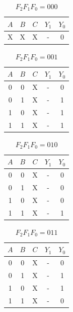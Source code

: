 \documentclass[11pt, a4paper]{article}
\begin{document}
\begin{minipage}[t]{0.48\textwidth}
\begin{table}[H]
    \centering
    \caption{$F_2 F_1 F_0 = 000$}
    \begin{tabular}{|ccc|cc|}
        \hline
        $A$ & $B$ & $C$ & $Y_1$ & $Y_0$ \\
        \hline
        X & X & X & - & 0 \\
        \hline
    \end{tabular}
\end{table}
\end{minipage}
\hfill
\begin{minipage}[t]{0.48\textwidth}
\begin{table}[H]
    \centering
    \caption{$F_2 F_1 F_0 = 001$}
    \begin{tabular}{|ccc|cc|}
        \hline
        $A$ & $B$ & $C$ & $Y_1$ & $Y_0$ \\
        \hline
        0 & 0 & X & - & 0 \\
        \hline
        0 & 1 & X & - & 1 \\
        \hline
        1 & 0 & X & - & 1 \\
        \hline
        1 & 1 & X & - & 1 \\
        \hline
    \end{tabular}
\end{table}
\end{minipage}

\medskip

\begin{minipage}[t]{0.48\textwidth}
\begin{table}[H]
    \centering
    \caption{$F_2 F_1 F_0 = 010$}
    \begin{tabular}{|ccc|cc|}
        \hline
        $A$ & $B$ & $C$ & $Y_1$ & $Y_0$ \\
        \hline
        0 & 0 & X & - & 0 \\
        \hline
        0 & 1 & X & - & 0 \\
        \hline
        1 & 0 & X & - & 0 \\
        \hline
        1 & 1 & X & - & 1 \\
        \hline
    \end{tabular}
\end{table}
\end{minipage}
\hfill
\begin{minipage}[t]{0.48\textwidth}
    \begin{table}[H]
    \centering
    \caption{$F_2 F_1 F_0 = 011$}
    \begin{tabular}{|ccc|cc|}
        \hline
        $A$ & $B$ & $C$ & $Y_1$ & $Y_0$ \\
        \hline
        0 & 0 & X & - & 0 \\
        \hline
        0 & 1 & X & - & 1 \\
        \hline
        1 & 0 & X & - & 1 \\
        \hline
        1 & 1 & X & - & 0 \\
        \hline
    \end{tabular}
\end{table}
\end{minipage}
\end{document}
